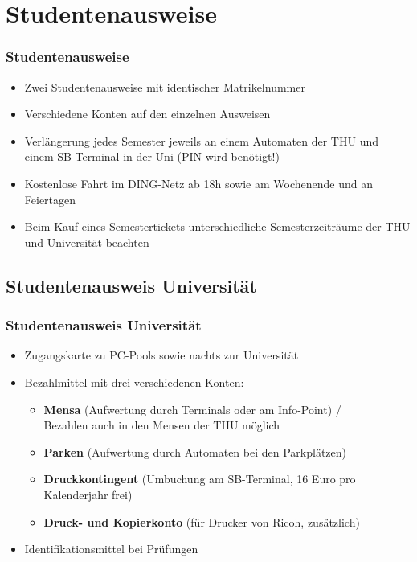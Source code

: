 \documentclass[10pt,a4paper]{beamer}
\begin{document}
\section{Studentenausweise}
\begin{frame}
\frametitle{Studentenausweise}
\begin{itemize}
	\setlength{\itemsep}{10pt} %
	\item Zwei Studentenausweise mit identischer Matrikelnummer
	\item Verschiedene Konten auf den einzelnen Ausweisen
	\item Verlängerung jedes Semester jeweils an einem Automaten der THU und einem SB-Terminal in der Uni (PIN wird benötigt!)
	\item Kostenlose Fahrt im DING-Netz ab 18h sowie am Wochenende und an Feiertagen	
	\item Beim Kauf eines Semestertickets unterschiedliche Semesterzeiträume der THU und Universität beachten
\end{itemize}
\end{frame}

\subsection*{Studentenausweis Universität}
\begin{frame}
\frametitle{Studentenausweis Universität}
\begin{itemize}
	\setlength{\itemsep}{10pt} %
	\item Zugangskarte zu PC-Pools sowie nachts zur Universität
	\item Bezahlmittel mit drei verschiedenen Konten:
	\begin{itemize}
		\setlength{\itemsep}{10pt} %
		\item \textbf{Mensa} (Aufwertung durch Terminals oder am Info-Point) / \\ Bezahlen auch in den Mensen der THU möglich
		\item \textbf{Parken} (Aufwertung durch Automaten bei den Parkplätzen)
		\item \textbf{Druckkontingent} (Umbuchung am SB-Terminal, 16 Euro pro Kalenderjahr frei)
		\item \textbf{Druck- und Kopierkonto} (für Drucker von Ricoh, zusätzlich)
	\end{itemize}
	\item Identifikationsmittel bei Prüfungen
\end{itemize}
\end{frame}
\end{document}
